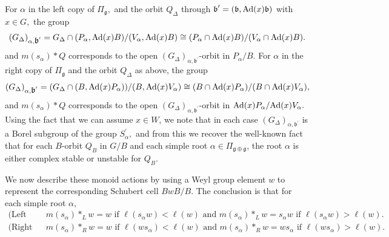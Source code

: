 \documentclass[12pt]{amsart}
\numberwithin{equation}{section}
\newcommand{\fg}{\mbox{${\mathfrak g}$}}
\newcommand{\fb}{\mbox{${\mathfrak b}$}}
\newcommand{\Ad}{{\rm Ad}}
\newcommand{\ms}{m(s_{\alpha})}
\begin{document}
For $\alpha$ in the left copy of $\Pi_{\fg},$ and the orbit $Q_{\Delta}$ through $\fb^{\prime}=(\fb,\Ad(x)\fb)$ with $x\in G,$ the group
\begin{equation}\label{e:Galphaleftgroup}
(G_{\Delta})_{\alpha, \fb^{\prime}}=G_{\Delta} \cap (P_{\alpha},\Ad(x)B)/(V_{\alpha},\Ad(x)B) \cong (P_{\alpha} \cap \Ad(x)B)/(V_{\alpha}\cap \Ad(x)B).
\end{equation}
and $\ms * Q$ corresponds to the open $(G_{\Delta})_{\alpha, \fb^{\prime}}$-orbit 
in $P_{\alpha}/B.$
For $\alpha$ in the right copy of $\Pi_{\fg}$ and the orbit $Q_{\Delta}$ as above,
the group
\begin{equation}\label{e:Galpharightgroup}
(G_{\Delta})_{\alpha, \fb^{\prime}}=(G_{\Delta} \cap (B,\Ad(x)P_{\alpha}))/(B,\Ad(x)V_{\alpha}) \cong (B \cap \Ad(x)P_{\alpha})/(B \cap \Ad(x)V_{\alpha}),
\end{equation}
and $\ms * Q$ corresponds to the open $(G_{\Delta})_{\alpha, \fb^{\prime}}$-orbit in $\Ad(x)P_{\alpha}/\Ad(x)V_{\alpha}.$
 Using the fact that we can assume $x\in W$, we note that in each case $(G_{\Delta})_{\alpha, \fb^{\prime}}$ is a Borel subgroup of the group $S^{\prime}_{\alpha},$ and from this we recover the well-known fact that
 for each $B$-orbit $Q_{B}$ in $G/B$ and each simple root $\alpha\in\Pi_{\fg \oplus \fg}$, the root $\alpha$ is either complex stable or unstable for $Q_{B}$. 

We now describe these monoid actions by using a Weyl group element $w$ to represent the corresponding Schubert cell $BwB/B.$  The conclusion is that for each simple root $\alpha,$
\begin{equation}\label{eq:Wmonoidact}
\begin{split}
\mbox{(Left Action) } &m(s_{\alpha})*_{L} w=w \mbox{ if } \ell(s_{\alpha}w)<\ell(w) \mbox{ and } m(s_{\alpha})*_{L}w=s_{\alpha}w\mbox{ if } \ell(s_{\alpha}w)>\ell(w).\\
\mbox{(Right Action) } &m(s_{\alpha})*_{R}w=w \mbox{ if } \ell(ws_{\alpha})<\ell(w) \mbox{ and } m(s_{\alpha})*_{R}w=ws_{\alpha}\mbox{ if } \ell(ws_{\alpha})>\ell(w).\\
\end{split}
\end{equation}
\end{document}
